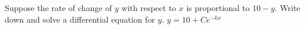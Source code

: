 {
Suppose the rate of change of $y$ with respect to $x$ is proportional to $10 - y$.  Write down and solve a differential equation for $y$.
}
{
$y = 10 + Ce^{-kx}$
}
